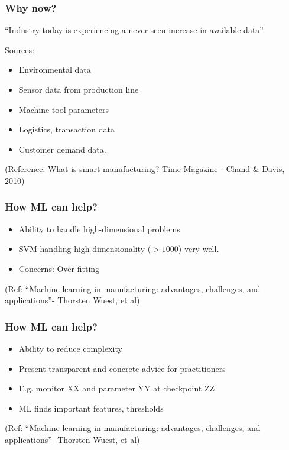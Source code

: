 \begin{frame}[fragile]\frametitle{Why now?}
\begin{center}
{\Large ``Industry today is experiencing a never seen increase in available data'' }
\end{center}
Sources:
\begin{itemize}
\item  Environmental data
\item Sensor data from production line
\item Machine tool parameters
\item Logistics, transaction data
\item Customer demand data.
\end{itemize}
\tiny{(Reference: What is smart manufacturing? Time Magazine - Chand \& Davis, 2010)}
\end{frame}

\begin{frame}[fragile]\frametitle{How ML can help?}

\begin{itemize}
\item  Ability to handle high-dimensional problems
\item SVM handling high dimensionality ($>1000$) very well. 
\item Concerns: Over-fitting
\end{itemize}
{\tiny (Ref: ``Machine learning in manufacturing: advantages, challenges, and applications''- Thorsten Wuest, et al)}
\end{frame}


\begin{frame}[fragile]\frametitle{How ML can help?}

\begin{itemize}
\item  Ability to reduce complexity
\item Present transparent and concrete advice for practitioners 
\item E.g. monitor XX and parameter YY at checkpoint ZZ
\item ML finds important features, thresholds
\end{itemize}
{\tiny (Ref: ``Machine learning in manufacturing: advantages, challenges, and applications''- Thorsten Wuest, et al)}
\end{frame}

